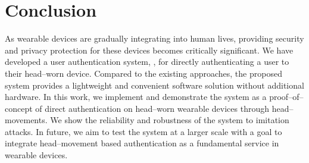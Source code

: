 \section{Conclusion}
As wearable devices are gradually integrating into human lives, providing security and privacy protection for these devices becomes critically significant. We have developed a user authentication system, \systemname, for directly authenticating a user to their head--worn device. Compared to the existing approaches, the proposed system provides a lightweight and convenient software solution without additional hardware. In this work, we implement and demonstrate the system as a proof--of--concept of direct authentication on head--worn wearable devices through head--movements.
We show the reliability and robustness of the system to imitation attacks.
In future, we aim to test the system at a larger scale with a goal to integrate head--movement based authentication as a fundamental service in wearable devices.
\iffalse
As a future work, it is important to study the impact of different music cues since they are hidden from the attackers in the  casual environment, which can be potentially increase the security of the system. Also, user identification function  can be adapted easily by indexing different users in the device.  
\fi